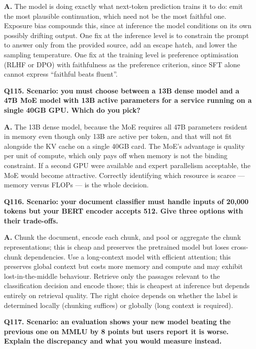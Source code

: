 \documentclass[11pt]{article}
\begin{document}
\noindent\textbf{A.} The model is doing exactly what next-token prediction trains it to do: emit the most plausible continuation, which need not be the most faithful one. Exposure bias compounds this, since at inference the model conditions on its own possibly drifting output. One fix at the inference level is to constrain the prompt to answer only from the provided source, add an escape hatch, and lower the sampling temperature. One fix at the training level is preference optimisation (RLHF or DPO) with faithfulness as the preference criterion, since SFT alone cannot express ``faithful beats fluent''.

\medskip
\noindent\textbf{Q115. Scenario: you must choose between a 13B dense model and a 47B MoE model with 13B active parameters for a service running on a single 40GB GPU. Which do you pick?}

\noindent\textbf{A.} The 13B dense model, because the MoE requires all 47B parameters resident in memory even though only 13B are active per token, and that will not fit alongside the KV cache on a single 40GB card. The MoE's advantage is quality per unit of compute, which only pays off when memory is not the binding constraint. If a second GPU were available and expert parallelism acceptable, the MoE would become attractive. Correctly identifying which resource is scarce --- memory versus FLOPs --- is the whole decision.

\medskip
\noindent\textbf{Q116. Scenario: your document classifier must handle inputs of 20{,}000 tokens but your BERT encoder accepts 512. Give three options with their trade-offs.}

\noindent\textbf{A.} Chunk the document, encode each chunk, and pool or aggregate the chunk representations; this is cheap and preserves the pretrained model but loses cross-chunk dependencies. Use a long-context model with efficient attention; this preserves global context but costs more memory and compute and may exhibit lost-in-the-middle behaviour. Retrieve only the passages relevant to the classification decision and encode those; this is cheapest at inference but depends entirely on retrieval quality. The right choice depends on whether the label is determined locally (chunking suffices) or globally (long context is required).

\medskip
\noindent\textbf{Q117. Scenario: an evaluation shows your new model beating the previous one on MMLU by 8 points but users report it is worse. Explain the discrepancy and what you would measure instead.}
\end{document}
